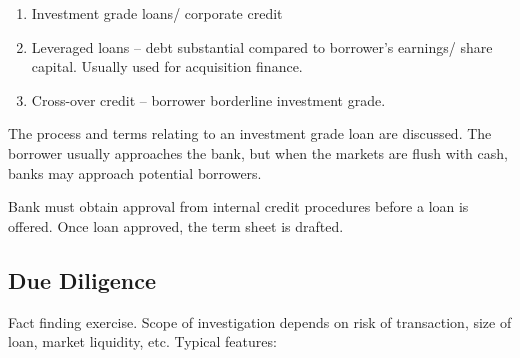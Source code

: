 \documentclass[
]{article}
\providecommand{\tightlist}{%
  \setlength{\itemsep}{0pt}\setlength{\parskip}{0pt}}
\begin{document}
\begin{enumerate}
\tightlist
\item
  Investment grade loans/ corporate credit
\item
  Leveraged loans -- debt substantial compared to borrower's earnings/
  share capital. Usually used for acquisition finance.
\item
  Cross-over credit -- borrower borderline investment grade.
\end{enumerate}

The process and terms relating to an investment grade loan are
discussed. The borrower usually approaches the bank, but when the
markets are flush with cash, banks may approach potential borrowers.

Bank must obtain approval from internal credit procedures before a loan
is offered. Once loan approved, the term sheet is drafted.

\hypertarget{due-diligence}{%
\subsection{Due Diligence}\label{due-diligence}}

Fact finding exercise. Scope of investigation depends on risk of
transaction, size of loan, market liquidity, etc. Typical features:
\end{document}
